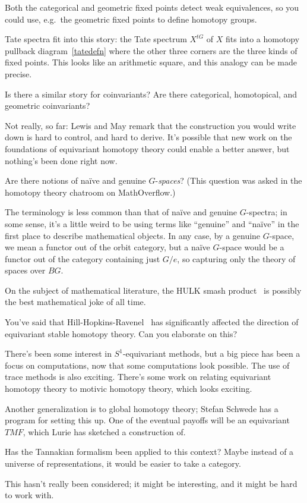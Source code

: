 Both the categorical and geometric fixed points detect weak equivalences, so you could use, e.g.\ the geometric
fixed points to define homotopy groups.

Tate spectra fit into this story: the Tate spectrum $X^{tG}$ of $X$ fits into a homotopy pullback
diagram~\eqref{tatedefn} where the other three corners are the three kinds of fixed points. This looks like an
arithmetic square, and this analogy can be made precise.
\begin{ques}
Is there a similar story for coinvariants? Are there categorical, homotopical, and geometric coinvariants?
\end{ques}
Not really, so far: Lewis and May remark that the construction you would write down is hard to control, and hard to
derive. It's possible that new work on the foundations of equivariant homotopy theory could enable a better answer,
but nothing's been done right now.
\begin{ques}
Are there notions of naïve and genuine $G$-\emph{spaces}? (This question was asked in the homotopy theory chatroom
on MathOverflow.)
\end{ques}
The terminology is less common than that of naïve and genuine $G$-spectra; in some sense, it's a little weird to
be using terms like ``genuine'' and ``naïve'' in the first place to describe mathematical objects. In any case, by
a genuine $G$-space, we mean a functor out of the orbit category, but a naïve $G$-space would be a functor out of
the category containing just $G/e$, so capturing only the theory of spaces over $BG$.

On the subject of mathematical literature, the HULK smash product~\cite{HulkSmash} is possibly the best
mathematical joke of all time.
\begin{ques}
You've said that Hill-Hopkins-Ravenel~\cite{HHR} has significantly affected the direction of equivariant stable
homotopy theory. Can you elaborate on this?
\end{ques}
There's been some interest in $S^1$-equivariant methods, but a big piece has been a focus on computations, now that
some computations look possible. The use of trace methods is also exciting. There's some work on relating
equivariant homotopy theory to motivic homotopy theory, which looks exciting.

Another generalization is to global homotopy theory; Stefan Schwede has a program for setting this up. One of the
eventual payoffs will be an equivariant $\mathit{TMF}$, which Lurie has sketched a construction of.
\begin{ques}
Has the Tannakian formalism been applied to this context? Maybe instead of a universe of representations, it would
be easier to take a category.
\end{ques}
This hasn't really been considered; it might be interesting, and it might be hard to work with.

